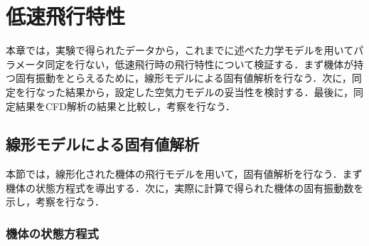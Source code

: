 
\chapter{低速飛行特性}
\label{flight_char}

本章では，実験で得られたデータから，これまでに述べた力学モデルを用いてパラメータ同定を行ない，低速飛行時の飛行特性について検証する．まず機体が持つ固有振動をとらえるために，線形モデルによる固有値解析を行なう．次に，同定を行なった結果から，設定した空気力モデルの妥当性を検討する．最後に，同定結果をCFD解析の結果と比較し，考察を行なう．

\section{線形モデルによる固有値解析}
\label{sec:analyze}

本節では，線形化された機体の飛行モデルを用いて，固有値解析を行なう．まず機体の状態方程式を導出する．次に，実際に計算で得られた機体の固有振動数を示し，考察を行なう．

\subsection{機体の状態方程式}

